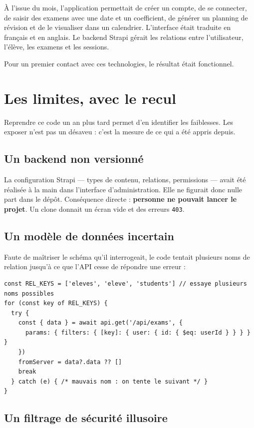 \documentclass[11pt,a4paper]{report}
\begin{document}
À l'issue du mois, l'application permettait de créer un compte, de se connecter,
de saisir des examens avec une date et un coefficient, de générer un planning de
révision et de le visualiser dans un calendrier. L'interface était traduite en
français et en anglais. Le backend Strapi gérait les relations entre l'utilisateur,
l'élève, les examens et les sessions.

Pour un premier contact avec ces technologies, le résultat était fonctionnel.

\section{Les limites, avec le recul}

Reprendre ce code un an plus tard permet d'en identifier les faiblesses. Les
exposer n'est pas un désaveu : c'est la mesure de ce qui a été appris depuis.

\subsection{Un backend non versionné}

La configuration Strapi --- types de contenu, relations, permissions --- avait été
réalisée à la main dans l'interface d'administration. Elle ne figurait donc nulle
part dans le dépôt. Conséquence directe : \textbf{personne ne pouvait lancer le
projet}. Un clone donnait un écran vide et des erreurs \texttt{403}.

\subsection{Un modèle de données incertain}

Faute de maîtriser le schéma qu'il interrogeait, le code tentait plusieurs noms de
relation jusqu'à ce que l'API cesse de répondre une erreur :

\begin{lstlisting}[style=ts,caption={Extrait de la version~1 --- le code devine son propre modèle}]
const REL_KEYS = ['eleves', 'eleve', 'students'] // essaye plusieurs noms possibles
for (const key of REL_KEYS) {
  try {
    const { data } = await api.get('/api/exams', {
      params: { filters: { [key]: { user: { id: { $eq: userId } } } } }
    })
    fromServer = data?.data ?? []
    break
  } catch (e) { /* mauvais nom : on tente le suivant */ }
}
\end{lstlisting}

\subsection{Un filtrage de sécurité illusoire}
\end{document}
